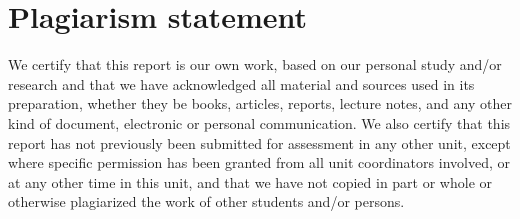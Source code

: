\section*{Plagiarism statement}

We certify that this report is our own work, based on our personal study and/or research and that we have acknowledged all material and sources used in its preparation, whether they be books, articles, reports, lecture notes, and any other kind of document, electronic or personal communication.
We also certify that this report has not previously been submitted for assessment in any other unit, except where specific permission has been granted from all unit coordinators involved, or at any other time in this unit, and that we have not copied in part or whole or otherwise plagiarized the work of other students and/or persons.
